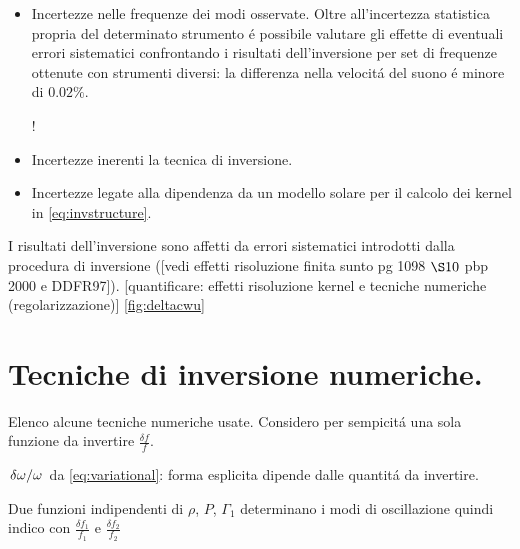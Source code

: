 \documentclass[../main.tex]{subfiles}
\begin{document}
\begin{itemize}

\item Incertezze nelle frequenze dei modi osservate. Oltre all'incertezza statistica propria del determinato strumento \'e possibile valutare gli effette di eventuali errori sistematici confrontando i risultati dell'inversione per set di frequenze ottenute con strumenti diversi: la differenza nella velocit\'a del suono \'e minore di $0.02\%$.

\begin{workout}
!
\end{workout}


\item Incertezze inerenti la tecnica di inversione.

\item Incertezze legate alla dipendenza da un modello solare per il calcolo dei kernel in \eqref{eq:invstructure}.

\end{itemize}

\begin{workout}
I risultati dell'inversione sono affetti da errori sistematici introdotti dalla procedura di inversione ([vedi effetti risoluzione finita sunto pg 1098 $\S 10$ pbp 2000 e DDFR97]).
[quantificare: effetti risoluzione kernel e tecniche numeriche (regolarizzazione)]
\ref{fig:deltacwu}
\end{workout}

\section{Tecniche di inversione numeriche.}

Elenco alcune tecniche numeriche usate. Considero per sempicit\'a una sola funzione da invertire $\frac{\delta f}{f}$.

\begin{workout}

$\left.{\delta\omega}\middle/{\omega}\right.$ da \eqref{eq:variational}: forma esplicita dipende dalle quantit\'a da invertire.

Due funzioni indipendenti di $\rho$, $P$, $\Gamma_1$ determinano i modi di oscillazione quindi indico con $\frac{\delta f_1}{f_1}$ e $\frac{\delta f_2}{f_2}$

\end{workout}
\end{document}
